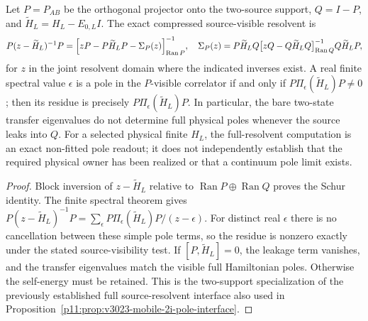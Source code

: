 \documentclass[12pt,a4paper]{article}
\begin{document}
\begin{proposition}
\label{p11:prop:two-support-full-resolvent-pole-certificate}
Let \(P=P_{AB}\) be the orthogonal projector onto the two-source support,
\(Q=I-P\), and \(\widetilde H_L=H_L-E_{0,L}I\). The exact compressed
source-visible resolvent is
\begin{equation}
\label{p11:eq:two-support-schur-pole-certificate}
P(z-\widetilde H_L)^{-1}P
=\Bigl[zP-P\widetilde H_LP-\Sigma_P(z)\Bigr]_{\operatorname{Ran}P}^{-1},
\quad
\Sigma_P(z)=P\widetilde H_LQ
\bigl[zQ-Q\widetilde H_LQ\bigr]_{\operatorname{Ran}Q}^{-1}
Q\widetilde H_LP,
\end{equation}
for \(z\) in the joint resolvent domain where the indicated inverses
exist. A real finite spectral value \(\epsilon\) is a pole in the
\(P\)-visible correlator if and only if
\(P\Pi_{\epsilon}(\widetilde H_L)P\ne0\); then its residue is precisely
\(P\Pi_{\epsilon}(\widetilde H_L)P\). In particular, the bare two-state
transfer eigenvalues do not determine full physical poles whenever the
source leaks into \(Q\). For a selected physical finite \(H_L\), the
full-resolvent computation is an exact non-fitted pole readout; it does
not independently establish that the required physical owner has been
realized or that a continuum pole limit exists.
\end{proposition}
\begin{proof}
Block inversion of \(z-\widetilde H_L\) relative to
\(\operatorname{Ran}P\oplus\operatorname{Ran}Q\) proves the Schur identity.
The finite spectral theorem gives
\(P(z-\widetilde H_L)^{-1}P=
\sum_{\epsilon}P\Pi_{\epsilon}(\widetilde H_L)P/(z-\epsilon)\).
For distinct real \(\epsilon\) there is no cancellation between
these simple pole terms, so the residue is nonzero exactly under the
stated source-visibility test. If \([P,\widetilde H_L]=0\), the leakage
term vanishes, and the transfer eigenvalues match the visible full
Hamiltonian poles. Otherwise the self-energy must be retained. This is
the two-support specialization of the previously established full
source-resolvent interface also used in
Proposition~\ref{p11:prop:v3023-mobile-2i-pole-interface}.
\end{proof}


\label{p11:part:constructed-qcd-blocks}
\end{document}
